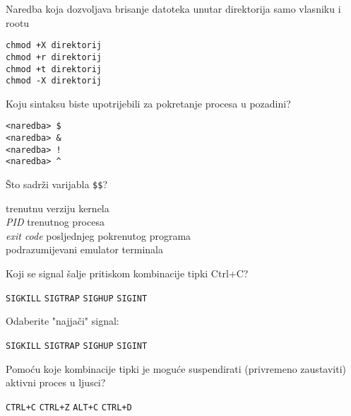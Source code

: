 \documentclass[a4paper,11pt]{exam}
\newcommand{\shell}[1]{\texttt{#1}}
\begin{document}
\begin{questions}
	\question
	Naredba koja dozvoljava brisanje datoteka unutar direktorija samo vlasniku i rootu 
	
	\begin{oneparchoices}
		\choice \shell{chmod +X direktorij} \\
		\choice \shell{chmod +r direktorij} \\
    	\CorrectChoice \shell{chmod +t direktorij}\\ 	
	  \choice \shell{chmod -X direktorij}
	\end{oneparchoices}

	\question
	Koju sintaksu biste upotrijebili za pokretanje procesa u pozadini?

	\begin{oneparchoices}
		\choice \shell{<naredba> \$} \\
		\CorrectChoice \shell{<naredba> \&} \\
		\choice \shell{<naredba> !} \\
		\choice \shell{<naredba> \textasciicircum} \\
	\end{oneparchoices}
	
	\question
  Što sadrži varijabla \shell{\$\$}?

	\begin{oneparchoices}
				\choice trenutnu verziju kernela\\
		\CorrectChoice \textit{PID} trenutnog procesa \\ 
		\choice \textit{exit code} posljednjeg pokrenutog programa\\
		\choice podrazumijevani emulator terminala
	\end{oneparchoices}
	
	\question
  Koji se signal šalje pritiskom kombinacije tipki Ctrl+C? 

  \begin{oneparchoices}
		\choice \shell{SIGKILL}
		\choice \shell{SIGTRAP}
    \choice \shell{SIGHUP}
    \CorrectChoice \shell{SIGINT}  
  \end{oneparchoices}

	\question
  Odaberite "najjači" signal:

  \begin{oneparchoices}
		\CorrectChoice \shell{SIGKILL}
		\choice \shell{SIGTRAP}
    \choice \shell{SIGHUP}
    \choice \shell{SIGINT}  
  \end{oneparchoices}


	\question
Pomoću koje kombinacije tipki je moguće suspendirati (privremeno zaustaviti) aktivni proces u ljusci?

  \begin{oneparchoices}
		\choice \shell{CTRL+C}
		\CorrectChoice \shell{CTRL+Z}
    \choice \shell{ALT+C}
    \choice \shell{CTRL+D}  
  \end{oneparchoices}
	
    

\end{questions}
\end{document}
